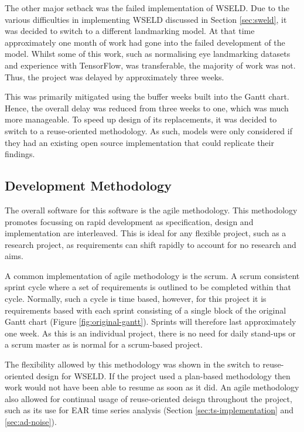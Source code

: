 The other major setback was the failed implementation of WSELD. Due to the various difficulties in implementing WSELD discussed in Section \ref{sec:sweld}, it was decided to switch to a different landmarking model. At that time approximately one month of work had gone into the failed development of the model. Whilst some of this work, such as normalising eye landmarking datasets and experience with TensorFlow, was transferable, the majority of work was not. Thus, the project was delayed by approximately three weeks. 

This was primarily mitigated using the buffer weeks built into the Gantt chart. Hence, the overall delay was reduced from three weeks to one, which was much more manageable. To speed up design of its replacements, it was decided to switch to a reuse-oriented methodology. As such, models were only considered if they had an existing open source implementation that could replicate their findings.

\subsection{Development Methodology}

The overall software for this software is the agile methodology\cite{beck2001manifesto}. This methodology promotes focussing on rapid development as specification, design and implementation are
interleaved\cite{archbold2023software}. This is ideal for any flexible project, such as a research project, as requirements can shift rapidly to account for no research and aims. 

A common implementation of agile methodology is the scrum. A scrum consistent sprint cycle where a set of requirements is outlined to be completed within that cycle. Normally, such a cycle is time based, however, for this project it is requirements based with each sprint consisting of a single block of the original Gantt chart (Figure \ref{fig:original-gantt}). Sprints will therefore last approximately one week. As this is an individual project, there is no need for daily stand-ups or a scrum master as is normal for a scrum-based project.

The flexibility allowed by this methodology was shown in the switch to reuse-oriented design for WSELD. If the project used a plan-based methodology then work would not have been able to resume as soon as it did. An agile methodology also allowed for continual usage of reuse-oriented deisgn throughout the project, such as its use for EAR time series analysis (Section \ref{sec:ts-implementation} and \ref{sec:ad-noise}).

